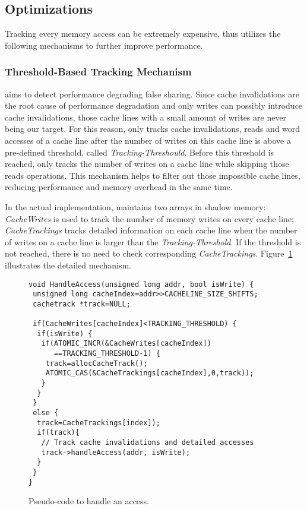\subsection{Optimizations}
\label{optimization}
Tracking every memory access can be extremely expensive, thus 
\Predator{} utilizes the following mechanisms to further improve performance.

\subsubsection{Threshold-Based Tracking Mechanism}
\label{sec:thresholdtracking}
\Predator{} aims to detect performance degrading false sharing.
Since cache invalidations are the root cause of performance degradation and only writes 
can possibly introduce cache invalidations, 
those cache lines with a small amount of writes are never being our target.
For this reason, \Predator{} only tracks cache invalidations, reads and word accesses 
of a cache line after the number of writes on this cache line is above a
pre-defined threshold, called {\it Tracking-Threshould}. 
Before this threshold is reached, \Predator{} only tracks the number of writes on a cache line 
while skipping those reads operations. 
This mechanism helps to filter out
those impossible cache lines, reducing performance and memory overhead
in the same time.

In the actual implementation, \Predator{} maintains two arrays in shadow memory: 
{\it CacheWrites} is used to track the number of memory writes on every cache line;
{\it CacheTrackings} tracks detailed information 
on each cache line when the number of writes on a cache line is larger than
the {\it Tracking-Threshold}. 
If the threshold is not reached, there is no need to check corresponding {\it CacheTrackings}. 
Figure~\ref{fig:algorithm} illustrates the detailed mechanism.

\begin{figure}[!t]
\begin{lstlisting}
void HandleAccess(unsigned long addr, bool isWrite) {
 unsigned long cacheIndex=addr>>CACHELINE_SIZE_SHIFTS;
 cachetrack *track=NULL;

 if(CacheWrites[cacheIndex]<TRACKING_THRESHOLD) {
  if(isWrite) {
   if(ATOMIC_INCR(&CacheWrites[cacheIndex]) 
      ==TRACKING_THRESHOLD-1) {
    track=allocCacheTrack();
    ATOMIC_CAS(&CacheTrackings[cacheIndex],0,track));
   }
  } 
 }
 else {
  track=CacheTrackings[index]);
  if(track){
   // Track cache invalidations and detailed accesses
   track->handleAccess(addr, isWrite);
  }
 }
}
\end{lstlisting}
\caption{Pseudo-code to handle an access.\label{fig:algorithm}}
\end{figure}

